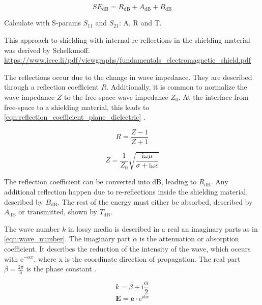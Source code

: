 \begin{equation}
    SE_{\mathrm{dB}}=R_{\mathrm{dB}}+A_{\mathrm{dB}}+B_{\mathrm{dB}}
    \label{eqn:se_rereflections}
\end{equation}

Calculate with S-params $S_{11}$ and $S_{21}$: A, R and T.  

This approach to shielding with internal re-reflections in the shielding material was derived by Schelkunoff. 
\url{https://www.ieee.li/pdf/viewgraphs/fundamentals_electromagnetic_shield.pdf}

The reflections occur due to the change in wave impedance. They are described through a reflection coefficient $R$. Additionally, it is common to normalize the wave impedance $Z$ to the free-space wave impedance $Z_0$. At the interface from free-space to a shielding material, this leads to \autoref{eqn:reflection_coefficient_plane_dielectric} \cite{Collin_2015}. 

\begin{equation}
    R=\frac{Z-1}{Z+1}
    \label{eqn:reflection_coefficient_plane_dielectric}
\end{equation}

\begin{equation}
    Z=\frac{1}{Z_0}\sqrt{\frac{\mathrm{i}\omega\mu}{\sigma+\mathrm{i}\omega\epsilon}}
    \label{eqn:rel_wave_imp}
\end{equation}

The reflection coefficient can be converted into dB, leading to $R_\mathrm{dB}$. Any additional reflection happen due to re-reflections inside the shielding material, described by $B_\mathrm{dB}$. The rest of the energy must either be absorbed, described by $A_\mathrm{dB}$ or transmitted, shown by $T_\mathrm{dB}$. 


The wave number $k$ in lossy media is described in a real an imaginary parts as in \autoref{eqn:wave_number}. The imaginary part $\alpha$ is the attenuation or absorption coefficient. It describes the reduction of the intensity of the wave, which occurs with $\mathrm{e}^{-\alpha x}$, where x is the coordinate direction of propagation. The real part $\beta=\frac{2\pi}{\lambda}$ is the phase constant \cite{Jackson}.


\begin{equation}
    k = \beta + \mathrm{i}\frac{\alpha}{2}
    \label{eqn:wave_number}
\end{equation}
\begin{equation}
    \mathbf{E} = \mathbf{e}\cdot \mathrm{e}^{\mathrm{i}kx}
\end{equation}

